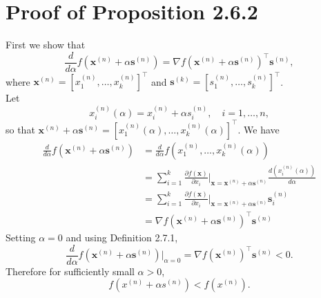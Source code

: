 \documentclass[honours,12pt]{unswthesis}
\numberwithin{equation}{section}
\theoremstyle{definition}
\begin{document}
\section{Proof of Proposition 2.6.2}\label{app:A.1}
First we show that
\[\frac{d}{d\alpha}f\left(\bm{x}^{(n)}+\alpha \bm{s}^{(n)}\right)=\nabla f\left(\bm{x}^{(n)}+\alpha \bm{s}^{(n)}\right)^\top \bm{s}^{(n)},\]
where $\bm{x}^{(n)}=\left[x_1^{(n)},\dots,x_k^{(n)}\right]^\top$ and $\bm{s}^{(k)}=\left[s_1^{(n)},\dots,s_k^{(n)}\right]^\top$.\\
Let
\[x_i^{(n)}(\alpha)=x_i^{(n)}+\alpha s_i^{(n)},\quad i=1,\dots,n,\]
so that $\bm{x}^{(n)}+\alpha \bm{s}^{(n)}=\left[x_1^{(n)}(\alpha),\dots,x_k^{(n)}(\alpha)\right]^\top$.
We have
\begin{align*}
\frac{d}{d\alpha}f\left(\bm{x}^{(n)}+\alpha\bm{s}^{(n)}\right)&= \frac{d}{d\alpha}f\left(x_1^{(n)},\dots,x_k^{(n)}(\alpha)\right)\\
&= \sum^k_{i=1}\frac{\partial f(\bm{x})}{\partial x_i}|_{\bm{x}=\bm{x}^{(n)}+\alpha \bm{s}^{(n)}}\frac{d\left(x_i^{(n)}(\alpha)\right)}{d\alpha}\\
&=\sum_{i=1}^k\frac{\partial f(\bm{x})}{\partial x_i}|_{\bm{x}=\bm{x}^{(n)}+\alpha \bm{s}^{(n)}}\bm{s}_i^{(n)}\\
&=\nabla f\left(\bm{x}^{(n)}+\alpha \bm{s}^{(n)}\right)^\top \bm{s}^{(n)}
\end{align*}
Setting $\alpha=0$ and using Definition 2.7.1,
\[\frac{d}{d\alpha}f\left(\bm{x}^{(n)}+\alpha\bm{s}^{(n)}\right)|_{\alpha=0}=\nabla f\left(\bm{x}^{(n)}\right)^\top \bm{s}^{(n)}<0.\]
Therefore for sufficiently small $\alpha>0$,
\[f\left(x^{(n)}+\alpha s^{(n)}\right)<f\left(x^{(n)}\right).\]
\end{document}
